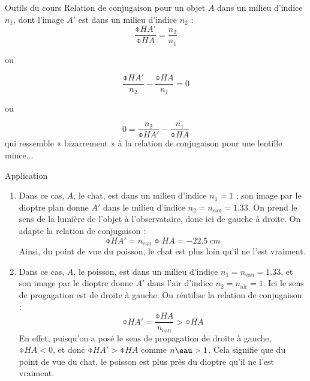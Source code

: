 \documentclass[../main/main.tex]{subfiles}
\begin{document}
\begin{tcbraster}[raster columns=4, raster equal height=rows]
    \begin{NCdemo}{Outils du cours}
        Relation de conjugaison pour un objet $A$ dans un milieu d'indice $n_1$,
        dont l'image $A'$ est dans un milieu d'indice $n_2$ :
        \[ \frac{\obar{HA'}}{\obar{HA}} = \frac{n_2}{n_1}\]
        \begin{center}
            ou
        \end{center}
        \[\frac{\obar{HA'}}{n_2} - \frac{\obar{HA}}{n_1} = 0 \]
        \begin{center}
            ou
        \end{center}
        \[ 0 = \frac{n_2}{\obar{HA'}} - \frac{n_1}{\obar{HA}} \]
        qui ressemble « bizarrement » à la relation de conjugaison pour une
        lentille mince...
    \end{NCdemo}    
    \begin{NCexem}[raster multicolumn=3]{Application}
        \begin{enumerate}
            \item Dans ce cas, $A$, le chat, est dans un milieu d'indice $n_1 =
                1$ ; son image par le dioptre plan donne $A'$ dans le milieu
                d'indice $n_2 = n _\mathrm{eau} = 1.33$. On prend le sens de la
                lumière de l'objet à l'observataire, donc ici de gauche à
                droite. On adapte la relation de conjugaison :
                \[ \obar{HA'} = n _\mathrm{eau}\obar{HA} = \SI{-22.5}{cm}\]
                Ainsi, du point de vue du poisson, le chat est plus loin qu'il
                ne l'est vraiment.
            \item Dans ce cas, $A$, le poisson, est dans un milieu d'indice $n_1
                = n _\mathrm{eau} = 1.33$, et son image par le dioptre donne
                $A'$ dans l'air d'indice $n_2 = n _\mathrm{air} = 1$. Ici le
                sens de progagation est de droite à gauche. On réutilise la
                relation de conjugaison :
                \[ \obar{HA'} = \frac{\obar{HA}}{n _\mathrm{eau}} > \obar{HA} \]
                En effet, puisqu'on a posé le sens de propagation de droite à
                gauche, $\obar{HA} < 0$, et donc $\obar{HA'} > \obar{HA}$ comme
                $n\eau > 1$. Cela signifie que du point de vue du chat, le
                poisson est plus près du dioptre qu'il ne l'est vraiment.
        \end{enumerate}
    \end{NCexem}
\end{tcbraster}
\end{document}
